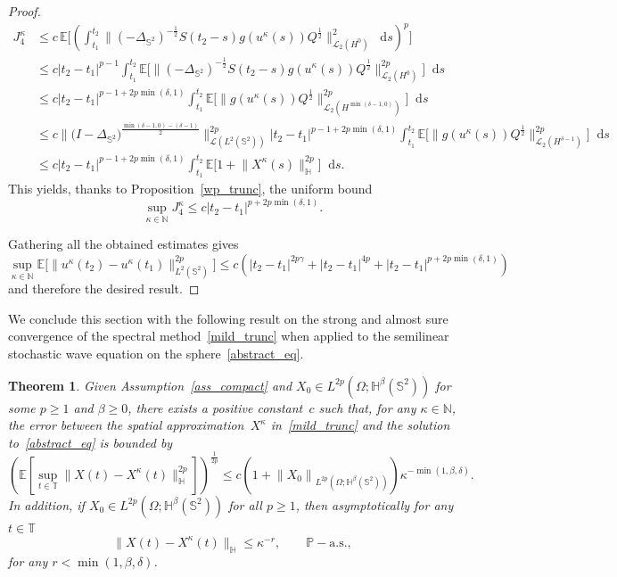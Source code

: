 \documentclass[a4paper]{amsart}
\newtheorem{thm}{Theorem}
\theoremstyle{remark}
\theoremstyle{definition}
\newcommand{\HH}{\mathbb{H}}
\newcommand*\dd{\mathop{}\!\mathrm{d}}
\newcommand{\IT}{\mathbb{T}}
\begin{document}
\begin{proof}
$$
\begin{aligned}
J_4^\kappa
&\le c \, \mathbb{E}\bigg[\left(\int_{t_1}^{t_2}\bigg\|(-\Delta_{\mathbb{S}^2})^{-\frac{1}{2}}S(t_2-s)g(u^\kappa(s))Q^{\frac{1}{2}}\bigg\|^2_{\mathcal{L}_2(H^0)}\dd s\right)^p\bigg]\\
&\le c |t_2-t_1|^{p-1}\int_{t_1}^{t_2}\mathbb{E}\bigg[\bigg\|(-\Delta_{\mathbb{S}^2})^{-\frac{1}{2}}S(t_2-s)g(u^\kappa(s))Q^{\frac{1}{2}}\bigg\|^{2p}_{\mathcal{L}_2(H^0)}\bigg]\dd s\\
&\le c |t_2-t_1|^{p-1+2p\min(\delta,1)}\int_{t_1}^{t_2}\mathbb{E}\bigg[\bigg\|g(u^\kappa(s))Q^{\frac{1}{2}}\bigg\|^{2p}_{\mathcal{L}_2(H^{\min(\delta-1,0)})}\bigg]\dd s\\
&\le c\bigg\|\big(I-\Delta_{\mathbb{S}^2}\big)^{\frac{\min(\delta-1,0)-(\delta-1)}{2}}\bigg\|^{2p}_{\mathcal{L}(L^2(\mathbb{S}^2))} |t_2-t_1|^{p-1+2p\min(\delta,1)}\int_{t_1}^{t_2}\mathbb{E}\bigg[\bigg\|g(u^\kappa(s))Q^{\frac{1}{2}}\bigg\|^{2p}_{\mathcal{L}_2(H^{\delta-1})}\bigg]\dd s\\
&\le c
|t_2-t_1|^{p-1+2p\min(\delta,1)}\int_{t_1}^{t_2}\mathbb{E}\bigg[1+\bigg\|X^\kappa(s)\bigg\|^{2p}_\HH \bigg]\dd s.
\end{aligned}
$$
This yields, thanks to Proposition~\ref{wp_trunc}, the uniform bound
$$
\sup_{\kappa\in\mathbb{N}} J_4^\kappa\le c |t_2-t_1|^{p+2p\min(\delta,1)}.
$$

Gathering all the obtained estimates gives
$$
\sup_{\kappa\in\mathbb{N}} \mathbb{E}\big[\big\| u^\kappa(t_2)-u^\kappa(t_1)\big\|^{2p}_{L^2(\mathbb{S}^2)}\big]
\le c\left(|t_2-t_1|^{2p\gamma}+|t_2-t_1|^{4p}+ |t_2-t_1|^{p+2p\min(\delta,1)}\right)
$$
and therefore the desired result. 
\end{proof}
We conclude this section with the following result on the strong and almost sure convergence of the spectral method~\eqref{mild_trunc} when applied to the semilinear stochastic wave equation on the sphere~\eqref{abstract_eq}.
\begin{thm}
\label{spa_thm}
Given Assumption~\ref{ass_compact} and $X_0\in L^{2p}(\Omega; {\HH}^\beta(\mathbb{S}^2))$ for some $p\geq1$ and $\beta\ge 0$, there exists a positive constant~$c$ such that, for any $\kappa\in \mathbb{N}$, the error between the spatial approximation~$X^\kappa$ in~\eqref{mild_trunc} and the solution to~\eqref{abstract_eq} is bounded by
\begin{equation*}
\label{strong_space}
\left(\mathbb{E}\left[\sup_{t\in\IT}\big\|X(t)-X^\kappa(t)\big\|^{2p}_\HH\right]\right)^{\frac{1}{2p}}\le c\left(1+\left\|X_0\right\|_{L^{2p}(\Omega; {\HH}^\beta(\mathbb{S}^2))}\right) \kappa^{-\min\left(1,\beta,\delta\right)}.
\end{equation*} 
In addition, if $X_0\in L^{2p}(\Omega; {\HH}^\beta(\mathbb{S}^2))$ for all $p\geq 1$, then asymptotically for any $t\in \IT$
\begin{equation*}
\big\|X(t)-X^\kappa(t)\big\|_{\HH} \le \kappa^{-r},  \qquad \mathbb{P}-\text{a.s.},
\end{equation*}
for any $r< \min(1,\beta,\delta)$. 
\end{thm}
\end{document}
